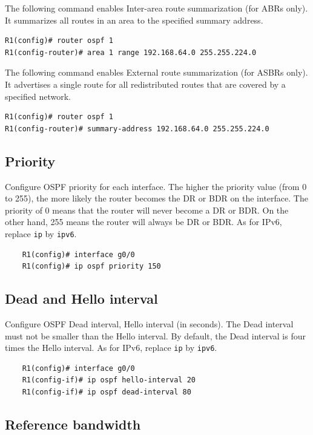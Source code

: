 The following command enables Inter-area route summarization (for ABRs only). It summarizes all routes in an area to the specified summary address.

\begin{verbatim}
R1(config)# router ospf 1
R1(config-router)# area 1 range 192.168.64.0 255.255.224.0
\end{verbatim}

The following command enables External route summarization (for ASBRs only). It advertises a single route for all redistributed routes that are covered by a specified network.

\begin{verbatim}
R1(config)# router ospf 1
R1(config-router)# summary-address 192.168.64.0 255.255.224.0
\end{verbatim}

\subsection{Priority}

Configure OSPF priority for each interface. The higher the priority value (from 0 to 255), the more likely the router becomes the DR or BDR on the interface.	The priority of 0 means that the router will never  become a DR or BDR. On the other hand, 255 means the router will always be DR or BDR. As for IPv6, replace \verb|ip| by \verb|ipv6|.
	\begin{verbatim}
	R1(config)# interface g0/0 
	R1(config)# ip ospf priority 150
	\end{verbatim}
	
\subsection{Dead and Hello interval}

Configure OSPF Dead interval, Hello interval (in seconds). \note The Dead interval must not be smaller than the Hello interval. By default, the Dead interval is four times the Hello interval. As for IPv6, replace \verb|ip| by \verb|ipv6|.
	\begin{verbatim}
	R1(config)# interface g0/0
	R1(config-if)# ip ospf hello-interval 20 
	R1(config-if)# ip ospf dead-interval 80
	\end{verbatim}
	
\subsection{Reference bandwidth}	


